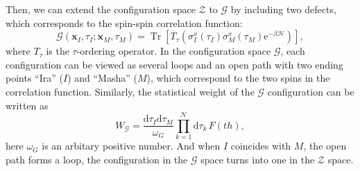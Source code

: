 \documentclass{article}
\DeclareMathOperator{\Tr}{Tr}
\theoremstyle{plain} \newtheorem{thm}{Theorem}[section]
\theoremstyle{definition} \newtheorem{df}{Definition}[section]
\theoremstyle{definition} \newtheorem{eg}{Example}
\theoremstyle{remark} \newtheorem*{rmk}{Remark}
\begin{document}
Then, we can extend the configuration space $\mathcal{Z}$ to $\mathcal{G}$ by including two defects, which corresponds to the spin-spin correlation function:
\begin{equation}
  \mathcal{G}(\bm{x}_I, \tau_I; \bm{x}_M, \tau_M) = \Tr\left[ T_\tau\left( \sigma_I^x(\tau_I)\sigma_M^x(\tau_M)\mathrm{e}^{-\beta\mathcal{H}} \right) \right],
\end{equation}
where $T_\tau$ is the $\tau$-ordering operator. In the configuration space $\mathcal{G}$, each configuration can be viewed as several loops and an open path with two ending points ``Ira'' ($I$) and ``Masha'' ($M$), which correspond to the two spins in the correlation function. Similarly, the statistical weight of the $\mathcal{G}$ configuration can be written as
\begin{equation}
  W_\mathcal{G} = \frac{\mathrm{d}\tau_I\mathrm{d}\tau_M}{\omega_G} \prod_{k=1}^{\mathcal{N}}\mathrm{d}\tau_k\,F(t h),
\end{equation}
here $\omega_G$ is an arbitary positive number. And when $I$ coincides with $M$, the open path forms a loop, the configuration in the $\mathcal{G}$ space turns into one in the $\mathcal{Z}$ space.
\end{document}
